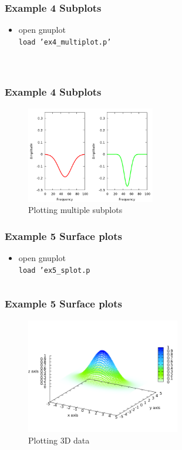 \documentclass{beamer}
\begin{document}
\begin{frame}[fragile]
\frametitle{Example 4 Subplots}
\begin{itemize}
\item open gnuplot \\ \texttt{load 'ex4\_multiplot.p'} 
\end{itemize}
\inputminted[fontsize=\small, firstline=4, lastline=9]{bash}{src/ex4_multiplot.p}
\inputminted[fontsize=\small, firstline=14, lastline=15]{bash}{src/ex4_multiplot.p}
\inputminted[fontsize=\small, firstline=27, lastline=28]{bash}{src/ex4_multiplot.p}
\end{frame}

\begin{frame}
\frametitle{Example 4 Subplots}
\begin{figure}
	\centering
	\includegraphics[width=0.5\textwidth]{src/ex4.png}
	\caption{Plotting multiple subplots}
	\label{fig:function}
\end{figure}
\end{frame}


\begin{frame}[fragile]
\frametitle{Example 5 Surface plots}
\begin{itemize}
\item open gnuplot \\ \texttt{load 'ex5\_splot.p}
\end{itemize}
\inputminted[fontsize=\small]{bash}{src/ex5_splot.p}
\end{frame}

\begin{frame}
\frametitle{Example 5 Surface plots}
\begin{figure}
	\centering
	\includegraphics[width=0.6\textwidth]{src/ex5.png}
	\caption{Plotting 3D data}
	\label{fig:function}
\end{figure}
\end{frame}
\end{document}
